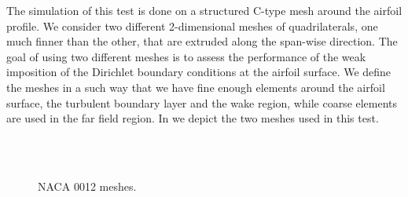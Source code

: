 The simulation of this test is done on a structured C-type mesh around the airfoil profile. We consider two different 2-dimensional meshes of quadrilaterals, one much finner than the other, that are extruded along the span-wise direction. The goal of using two different meshes is to assess the performance of the weak imposition of the Dirichlet boundary conditions at the airfoil surface. We define the meshes in a such way that we have fine enough elements around the airfoil surface, the turbulent boundary layer and the wake region, while coarse elements are used in the far field region. In  we depict the two meshes used in this test.
\begin{figure}[h!]
  \centering
  \\
  \\
  \caption{NACA 0012 meshes.}
  \label{fig-NACA_meshes}
\end{figure}
